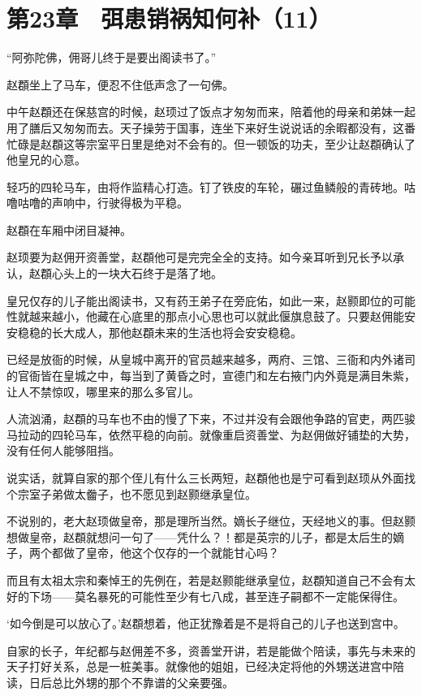 \section{第23章　弭患销祸知何补（11）}

“阿弥陀佛，佣哥儿终于是要出阁读书了。”

赵頵坐上了马车，便忍不住低声念了一句佛。

中午赵頵还在保慈宫的时候，赵顼过了饭点才匆匆而来，陪着他的母亲和弟妹一起用了膳后又匆匆而去。天子操劳于国事，连坐下来好生说说话的余暇都没有，这番忙碌是赵頵这等宗室平日里是绝对不会有的。但一顿饭的功夫，至少让赵頵确认了他皇兄的心意。

轻巧的四轮马车，由将作监精心打造。钉了铁皮的车轮，碾过鱼鳞般的青砖地。咕噜咕噜的声响中，行驶得极为平稳。

赵頵在车厢中闭目凝神。

赵顼要为赵佣开资善堂，赵頵他可是完完全全的支持。如今亲耳听到兄长予以承认，赵頵心头上的一块大石终于是落了地。

皇兄仅存的儿子能出阁读书，又有药王弟子在旁庇佑，如此一来，赵颢即位的可能性就越来越小，他藏在心底里的那点小心思也可以就此偃旗息鼓了。只要赵佣能安安稳稳的长大成人，那他赵頵未来的生活也将会安安稳稳。

已经是放衙的时候，从皇城中离开的官员越来越多，两府、三馆、三衙和内外诸司的官衙皆在皇城之中，每当到了黄昏之时，宣德门和左右掖门内外竟是满目朱紫，让人不禁惊叹，哪里来的那么多官儿。

人流汹涌，赵頵的马车也不由的慢了下来，不过并没有会跟他争路的官吏，两匹骏马拉动的四轮马车，依然平稳的向前。就像重启资善堂、为赵佣做好铺垫的大势，没有任何人能够阻挡。

说实话，就算自家的那个侄儿有什么三长两短，赵頵他也是宁可看到赵顼从外面找个宗室子弟做太齤子，也不愿见到赵颢继承皇位。

不说别的，老大赵顼做皇帝，那是理所当然。嫡长子继位，天经地义的事。但赵颢想做皇帝，赵頵就想问一句了——凭什么？！都是英宗的儿子，都是太后生的嫡子，两个都做了皇帝，他这个仅存的一个就能甘心吗？

而且有太祖太宗和秦悼王的先例在，若是赵颢能继承皇位，赵頵知道自己不会有太好的下场——莫名暴死的可能性至少有七八成，甚至连子嗣都不一定能保得住。

‘如今倒是可以放心了。’赵頵想着，他正犹豫着是不是将自己的儿子也送到宫中。

自家的长子，年纪都与赵佣差不多，资善堂开讲，若是能做个陪读，事先与未来的天子打好关系，总是一桩美事。就像他的姐姐，已经决定将他的外甥送进宫中陪读，日后总比外甥的那个不靠谱的父亲要强。

